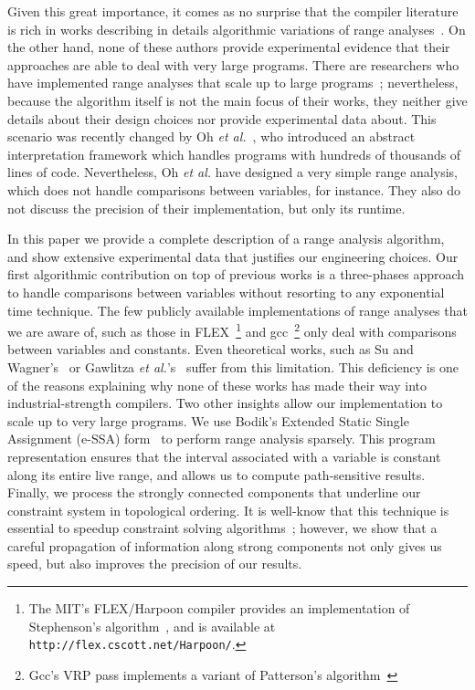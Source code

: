 \documentclass{llncs}
\begin{document}
Given this great importance, it comes as no surprise that the compiler
literature is rich in works describing in details algorithmic variations of
range analyses~\cite{Gawlitza09,Mahlke01,Stephenson00,Su05}.
On the other hand, none of these authors provide experimental evidence that
their approaches are able to deal with very large programs.
There are researchers who have implemented range analyses that scale up to
large programs~\cite{Blanchet03,Venet04}; nevertheless, because the
algorithm itself is not the main focus of their works, they neither give
details about their design choices nor provide experimental data about.
This scenario was recently changed by Oh {\em et al.}~\cite{Oh12}, who
introduced an abstract interpretation framework which handles programs with
hundreds of thousands of lines of code.
Nevertheless, Oh {\em et al.} have designed a very simple range analysis,
which does not handle comparisons between variables, for instance.
They also do not discuss the precision of their implementation, but only its
runtime.

In this paper we provide a complete description of a range analysis algorithm,
and show extensive experimental data that justifies our engineering choices.
Our first algorithmic contribution on top of previous works is a three-phases
approach to handle comparisons between variables without resorting to any
exponential time technique.
The few publicly available implementations of range analyses that we are
aware of, such as those in FLEX~\footnote{The MIT's FLEX/Harpoon compiler
provides an implementation of Stephenson's algorithm~\cite{Stephenson00}, and
is available at \texttt{http://flex.cscott.net/Harpoon/}.} and
gcc~\footnote{Gcc's VRP pass implements a variant of Patterson's
algorithm~\cite{Patterson95}} only deal with comparisons between variables and
constants.
Even theoretical works, such as Su and Wagner's~\cite{Su05} or Gawlitza
{\em et al.}'s~\cite{Gawlitza09} suffer from this limitation.
This deficiency is one of the reasons explaining why none of these works has
made their way into industrial-strength compilers.
Two other insights allow our implementation to scale up to very large
programs.
We use Bodik's Extended Static Single Assignment (e-SSA) form~\cite{Bodik00} to
perform range analysis sparsely.
This program representation ensures that the interval associated with
a variable is constant along its entire live range, and allows us to compute
path-sensitive results.
Finally, we process the strongly connected components that underline our
constraint system in topological ordering.
It is well-know that this technique is essential to speedup constraint solving
algorithms~\cite[Sec 6.3]{Nielson99}; however, we show that a careful
propagation of information along strong components not only gives us speed, but
also improves the precision of our results.
\end{document}
